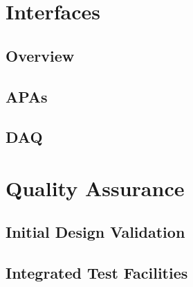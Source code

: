 \section{Interfaces}
\label{sec:fdsp-tpc-elec-intfc}


\subsection{Overview}
\label{sec:fdsp-tpc-elec-intfc-ov}


\subsection{APAs}
\label{sec:fdsp-tpc-elec-intfc-apa}


\subsection{DAQ}
\label{sec:fdsp-tpc-elec-intfc-daq}



\section{Quality Assurance}
\label{sec:fdsp-tpc-elec-qa}


\subsection{Initial Design Validation}
\label{sec:fdsp-tpc-elec-qa-initial}


\subsection{Integrated Test Facilities}
\label{sec:fdsp-tpc-elec-qa-facilities}


